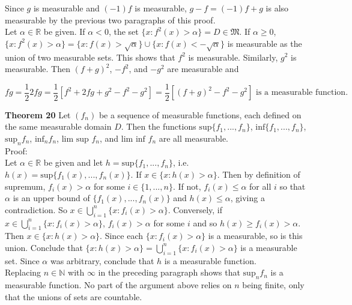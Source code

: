 \documentclass[a4paper]{article}
\begin{document}
Since $g$ is measurable and $(-1)f$ is measurable, $g-f = (-1)f + g$ is also measurable by the previous two paragraphs of this proof. \\

Let $\alpha \in \mathbb{R}$ be given. If $\alpha < 0$, the set $\{x : f^2(x) > \alpha\} = D \in \mathfrak{M}$. If $\alpha \geq 0$, $\{x : f^2(x) > \alpha\} = \{x : f(x) > \sqrt{\alpha}\} \cup \{x : f(x) < -\sqrt{\alpha}\}$ is measurable as the union of two measurable sets. This shows that $f^2$ is measurable. Similarly, $g^2$ is measurable. Then $(f+g)^2$, $-f^2$, and $-g^2$ are measurable and

$$fg  = \frac{1}{2}2fg = \frac{1}{2}[f^2 + 2fg + g^2 -f^2 - g^2] = \frac{1}{2}[(f+g)^2 - f^2 - g^2] \text{ is a measurable function}.$$



{\bf Theorem 20} Let $(f_n)$ be a sequence of measurable functions, each defined on the same measurable domain $D$. Then the functions $\text{sup}\{f_1,...,f_n\}$, $\text{inf}\{f_1,...,f_n\}$, $\text{sup}_{n} f_n$, $\text{inf}_n f_n$, $\text{lim sup } f_n$, and $\text{lim inf } f_n$ are all measurable. \\

Proof: \\

Let $\alpha \in \mathbb{R}$ be given and let $h =\text{sup}\{f_1,...,f_n\}$, i.e. $h(x) = \text{sup}\{f_1(x),...,f_n(x)\}$. If $x \in \{x : h(x) > \alpha\}$. Then by definition of supremum, $f_i(x) > \alpha$ for some $i \in \{1,...,n\}$. If not, $f_i(x) \leq \alpha$ for all $i$ so that $\alpha$ is an upper bound of $\{f_1(x),...,f_n(x)\}$ and $h(x) \leq \alpha$, giving a contradiction. So $x \in \bigcup_{i=1}^n \{x : f_i(x) > \alpha\}$. Conversely, if $x \in \bigcup_{i=1}^n \{x : f_i(x) > \alpha\}$, $f_i(x) > \alpha$ for some $i$ and so $h(x) \geq f_i(x) > \alpha$. Then $x \in \{x : h(x) > \alpha\}$. Since each $\{x : f_i(x) > \alpha\}$ is a measurable, so is this union. Conclude that $\{x : h(x) > \alpha\}= \bigcup_{i=1}^n \{x : f_i(x) > \alpha\}$ is a measurable set. Since $\alpha$ was arbitrary, conclude that $h$ is a measurable function. \\

Replacing $n \in \mathbb{N}$ with $\infty$ in the preceding paragraph shows that $\text{sup}_n f_n$ is a measurable function. No part of the argument above relies on $n$ being finite, only that the unions of sets are countable.\\
\end{document}
